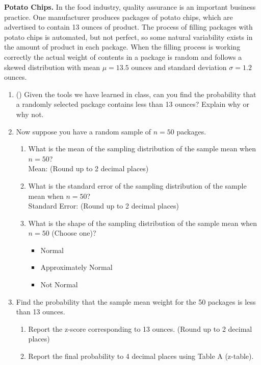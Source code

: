 \item \textbf{Potato Chips.} In the food industry, quality assurance is an important business practice. One manufacturer produces packages of potato chips, which are advertised to contain 13 ounces of product. The process of filling packages with potato chips is automated, but not perfect, so some natural variability exists in the amount of product in each package. When the filling process is working correctly the actual weight of contents in a package is random and follows a skewed distribution with mean $\mu=13.5$ ounces and standard deviation $\sigma=1.2$ ounces. 


\begin{enumerate}
\item (\textbf{}) Given the tools we have learned in class, can you find the probability that a randomly selected package contains less than 13 ounces?  Explain why or why not.

\item Now suppose you have a random sample of $n=50$ packages. 
\begin{enumerate}
  \item What is the mean of the sampling distribution of the sample mean when $n=50$? \\ 
        Mean: \underline{\hspace{2cm}}   (Round up to 2 decimal places)
  
  
  \item What is the standard error of the sampling distribution of the sample mean when $n=50$?\\ 
  Standard Error: \underline{\hspace{2cm}}    (Round up to 2 decimal places)
  
  \item What is the shape of the sampling distribution of the sample mean when $n=50$ (Choose one)?
    \begin{itemize}
      \item Normal
      \item Approximately Normal
      \item Not Normal\\
    \end{itemize}
\end{enumerate}



\item Find the probability that the sample mean weight for the 50 packages is less than 13 ounces. 
	\begin{enumerate}
    \item Report the z-score corresponding to 13 ounces. (Round up to 2 decimal places)
    \item Report the final probability to 4 decimal places using Table A (z-table).\\
	\end{enumerate}
	

\end{enumerate}
